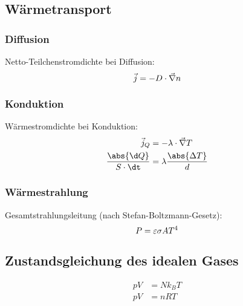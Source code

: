 \documentclass[twocolumn]{summery_3.1}
\begin{document}
\subsection{Wärmetransport}
{
    \subsubsection{Diffusion}
    {
        Netto-Teilchenstromdichte bei Diffusion:
        \begin{equation*}
            \vec{j} = -D\cdot \vec{\nabla}n\\
        \end{equation*}
    }
    \subsubsection{Konduktion}
    {
        Wärmestromdichte bei Konduktion:
        \begin{align*}
            \vec{j}_Q &= -\lambda\cdot \vec{\nabla}T\\
            \frac{\abs{\d Q}}{S\cdot \dt} &= \lambda \frac{\abs{\Delta T}}{d}
        \end{align*}
    }
    \subsubsection{Wärmestrahlung}
    {
        Gesamtstrahlungsleitung (nach Stefan-Boltzmann-Gesetz):
        \begin{equation*}
            P = \varepsilon \sigma A T^4\\
        \end{equation*}
    }
}

\subsection{Zustandsgleichung des idealen Gases}
\begin{align*}
    pV &= N k_B T\\
    pV &= n R T
\end{align*}
\end{document}
